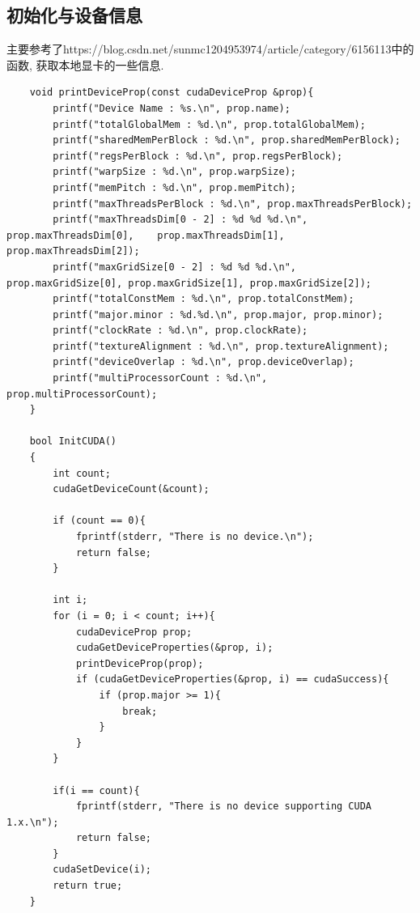 \documentclass{article}
\begin{document}
  \subsection{初始化与设备信息}
  主要参考了https://blog.csdn.net/sunmc1204953974/article/category/6156113中的函数, 获取本地显卡的一些信息.
  \lstset{language=C++}
  \begin{lstlisting}
    void printDeviceProp(const cudaDeviceProp &prop){
        printf("Device Name : %s.\n", prop.name);
        printf("totalGlobalMem : %d.\n", prop.totalGlobalMem);
        printf("sharedMemPerBlock : %d.\n", prop.sharedMemPerBlock);
        printf("regsPerBlock : %d.\n", prop.regsPerBlock);
        printf("warpSize : %d.\n", prop.warpSize);
        printf("memPitch : %d.\n", prop.memPitch);
        printf("maxThreadsPerBlock : %d.\n", prop.maxThreadsPerBlock);
        printf("maxThreadsDim[0 - 2] : %d %d %d.\n", prop.maxThreadsDim[0],    prop.maxThreadsDim[1], prop.maxThreadsDim[2]);
        printf("maxGridSize[0 - 2] : %d %d %d.\n", prop.maxGridSize[0], prop.maxGridSize[1], prop.maxGridSize[2]);
        printf("totalConstMem : %d.\n", prop.totalConstMem);
        printf("major.minor : %d.%d.\n", prop.major, prop.minor);
        printf("clockRate : %d.\n", prop.clockRate);
        printf("textureAlignment : %d.\n", prop.textureAlignment);
        printf("deviceOverlap : %d.\n", prop.deviceOverlap);
        printf("multiProcessorCount : %d.\n", prop.multiProcessorCount);
    }

    bool InitCUDA()
    {
        int count;
        cudaGetDeviceCount(&count);

        if (count == 0){
            fprintf(stderr, "There is no device.\n");
            return false;
        }

        int i;
        for (i = 0; i < count; i++){
            cudaDeviceProp prop;
            cudaGetDeviceProperties(&prop, i);
            printDeviceProp(prop);
            if (cudaGetDeviceProperties(&prop, i) == cudaSuccess){
                if (prop.major >= 1){
                    break;
                }
            }
        }

        if(i == count){
            fprintf(stderr, "There is no device supporting CUDA 1.x.\n");
            return false;
        }
        cudaSetDevice(i);
        return true;
    }
  \end{lstlisting}
\end{document}
